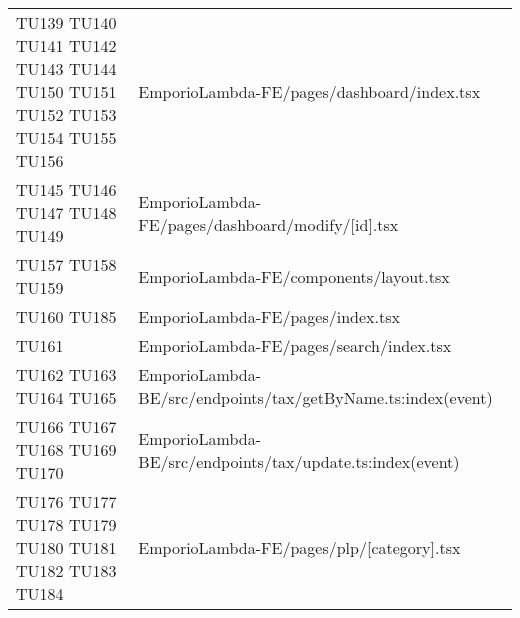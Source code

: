 {\begin{longtable}{C{2cm} C{12.8cm}}
TU139 \newline TU140 \newline TU141 \newline TU142 \newline TU143 \newline TU144 \newline TU150 \newline TU151 \newline TU152 \newline TU153 \newline TU154 \newline TU155 \newline TU156 & EmporioLambda-FE/pages/dashboard/index.tsx\\

TU145 \newline TU146 \newline TU147 \newline TU148 \newline TU149 & EmporioLambda-FE/pages/dashboard/modify/[id].tsx\\



TU157 \newline TU158 \newline TU159 & EmporioLambda-FE/components/layout.tsx\\

TU160 \newline TU185 & EmporioLambda-FE/pages/index.tsx\\

TU161 & EmporioLambda-FE/pages/search/index.tsx\\

TU162 \newline TU163 \newline TU164 \newline TU165 & EmporioLambda-BE/src/endpoints/tax/getByName.ts:index(event)\\

TU166 \newline TU167 \newline TU168 \newline TU169 \newline TU170 & EmporioLambda-BE/src/endpoints/tax/update.ts:index(event)\\

TU176 \newline TU177 \newline TU178 \newline TU179 \newline TU180 \newline TU181 \newline TU182 \newline TU183 \newline TU184 & EmporioLambda-FE/pages/plp/[category].tsx\\





\end{longtable}

}

